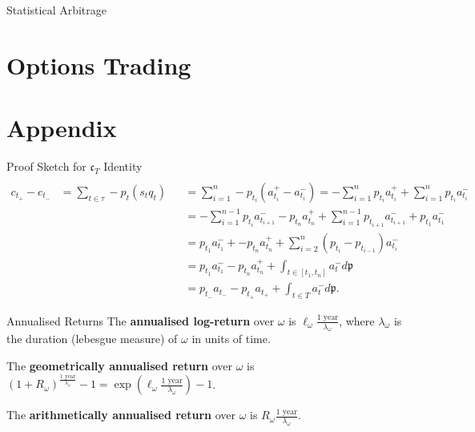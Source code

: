 \documentclass{beamer}
\begin{document}
\begin{frame}{Statistical Arbitrage}
\end{frame}

\section{Options Trading}


\section{Appendix}
\begin{frame}{Proof Sketch for $\mathfrak{c}_T$ Identity}
	\begin{align*}
		\\	c_{t_+} - c_{t_-}	&= \sum_{t\in\tau} - p_t (s_t q_t)	&&= \sum_{i=1}^n - p_{t_i} (a_{t_i}^+-a_{t_i}^-) = - \sum_{i=1}^n p_{t_i} a_{t_i}^+ + \sum_{i=1}^n p_{t_i} a_{t_i}^-
		\\				&					&&= - \sum_{i=1}^{n-1} p_{t_i} a_{t_{i+1}}^- - p_{t_n} a_{t_n}^+ + \sum_{i=1}^{n-1} p_{t_{i+1}} a_{t_{i+1}}^- + p_{t_1}a_{t_1}^-
		\\				&					&&= p_{t_1}a_{t_1}^- + - p_{t_n} a_{t_n}^+ + \sum_{i=2}^n (p_{t_i}-p_{t_{i-1}}) a_{t_i}^-
		\\				&					&&= p_{t_1}a_{t_1}^- - p_{t_n}a_{t_n}^+ + \int_{t\in[t_1,t_n]} a_t^- d\mathfrak{p}
		\\				&					&&= p_{t_-}a_{t_-} - p_{t_+}a_{t_+} + \int_{t\in T} a_t^- d\mathfrak{p}.
	\end{align*}
\end{frame}

\begin{frame}{Annualised Returns}
	The \textbf{annualised log-return} over $\omega$ is $\ell_\omega \frac{\textrm{1 year}}{\lambda_\omega}$, where $\lambda_\omega$ is the duration (lebesgue measure) of $\omega$ in units of time.%

	The \textbf{geometrically annualised return} over $\omega$ is $(1 + R_\omega)^\frac{\textrm{1 year}}{\lambda_\omega} - 1 = \exp\left(\ell_\omega \frac{\textrm{1 year}}{\lambda_\omega}\right) - 1$.

	The \textbf{arithmetically annualised return} over $\omega$ is $R_\omega \frac{\textrm{1 year}}{\lambda_\omega}$. %

\end{frame}
\end{document}
